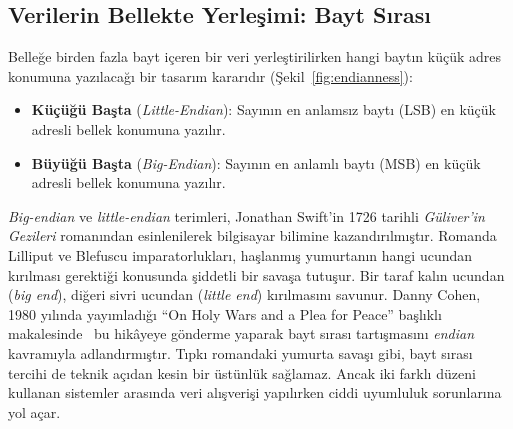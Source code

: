 \subsection{Verilerin Bellekte Yerleşimi: Bayt Sırası}
\label{subsec:bayt-sirasi}

Belleğe birden fazla bayt içeren bir veri yerleştirilirken hangi baytın küçük adres konumuna yazılacağı bir tasarım kararıdır (Şekil~\ref{fig:endianness}):
\begin{itemize}
\item \textbf{Küçüğü Başta} (\emph{Little-Endian}): Sayının en anlamsız baytı (LSB) en küçük adresli bellek konumuna yazılır.
\item \textbf{Büyüğü Başta} (\emph{Big-Endian}): Sayının en anlamlı baytı (MSB) en küçük adresli bellek konumuna yazılır.
\end{itemize}

\begin{bilginot}
\emph{Big-endian} ve \emph{little-endian} terimleri, Jonathan Swift'in 1726 tarihli \emph{Güliver'in Gezileri} romanından esinlenilerek bilgisayar bilimine kazandırılmıştır. Romanda Lilliput ve Blefuscu imparatorlukları, haşlanmış yumurtanın hangi ucundan kırılması gerektiği konusunda şiddetli bir savaşa tutuşur. Bir taraf kalın ucundan (\emph{big end}), diğeri sivri ucundan (\emph{little end}) kırılmasını savunur. Danny Cohen, 1980 yılında yayımladığı ``On Holy Wars and a Plea for Peace'' başlıklı makalesinde~\cite{cohen1980} bu hikâyeye gönderme yaparak bayt sırası tartışmasını \emph{endian} kavramıyla adlandırmıştır. Tıpkı romandaki yumurta savaşı gibi, bayt sırası tercihi de teknik açıdan kesin bir üstünlük sağlamaz. Ancak iki farklı düzeni kullanan sistemler arasında veri alışverişi yapılırken ciddi uyumluluk sorunlarına yol açar.
\end{bilginot}

